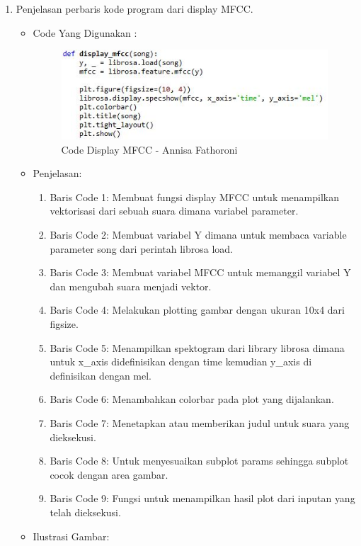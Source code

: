 \begin{enumerate}
\item Penjelasan perbaris kode program dari display MFCC.
\begin{itemize}
\item Code Yang Digunakan :
\begin{figure}[!hbtp]
\centering
\includegraphics[scale=0.7]{figures/Chapter6AnnisaFathoroni14.jpg}
\caption{Code Display MFCC - Annisa Fathoroni}
\label{Code Display MFCC - Annisa Fathoroni}
\end{figure}

\item Penjelasan:

\begin{enumerate}
\item Baris Code 1: Membuat fungsi display MFCC untuk menampilkan vektorisasi dari sebuah suara dimana variabel parameter.
\item Baris Code 2: Membuat variabel Y dimana untuk membaca variable parameter song dari perintah librosa load.
\item Baris Code 3: Membuat variabel MFCC untuk memanggil variabel Y dan mengubah suara menjadi vektor.
\item Baris Code 4: Melakukan plotting gambar dengan ukuran 10x4 dari figsize.
\item Baris Code 5: Menampilkan spektogram dari library librosa dimana untuk x\_axis didefinisikan dengan time kemudian y\_axis di definisikan dengan mel.
\item Baris Code 6: Menambahkan colorbar pada plot yang dijalankan.
\item Baris Code 7: Menetapkan atau memberikan judul untuk suara yang dieksekusi.
\item Baris Code 8: Untuk menyesuaikan subplot params sehingga subplot cocok dengan area gambar.
\item Baris Code 9: Fungsi untuk menampilkan hasil plot dari inputan yang telah dieksekusi.
\end{enumerate}

\item Ilustrasi Gambar:


\end{itemize}
\end{enumerate}
